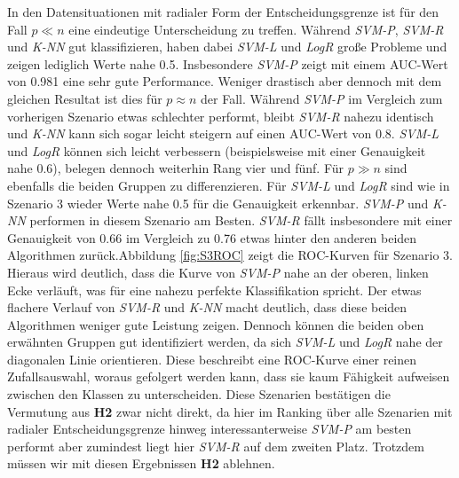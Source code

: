 \documentclass[
]{article}
\begin{document}
In den Datensituationen mit radialer Form der Entscheidungsgrenze ist
für den Fall \(p \ll n\) eine eindeutige Unterscheidung zu treffen.
Während \textit{SVM-P}, \textit{SVM-R} und \textit{K-NN} gut
klassifizieren, haben dabei \textit{SVM-L} und \textit{LogR} große
Probleme und zeigen lediglich Werte nahe 0.5. Insbesondere
\textit{SVM-P} zeigt mit einem AUC-Wert von 0.981 eine sehr gute
Performance. Weniger drastisch aber dennoch mit dem gleichen Resultat
ist dies für \(p \approx n\) der Fall. Während \textit{SVM-P} im
Vergleich zum vorherigen Szenario etwas schlechter performt, bleibt
\textit{SVM-R} nahezu identisch und \textit{K-NN} kann sich sogar leicht
steigern auf einen AUC-Wert von 0.8. \textit{SVM-L} und \textit{LogR}
können sich leicht verbessern (beispielsweise mit einer Genauigkeit nahe
0.6), belegen dennoch weiterhin Rang vier und fünf. Für \(p \gg n\) sind
ebenfalls die beiden Gruppen zu differenzieren. Für \textit{SVM-L} und
\textit{LogR} sind wie in Szenario 3 wieder Werte nahe 0.5 für die
Genauigkeit erkennbar. \textit{SVM-P} und \textit{K-NN} performen in
diesem Szenario am Besten. \textit{SVM-R} fällt insbesondere mit einer
Genauigkeit von 0.66 im Vergleich zu 0.76 etwas hinter den anderen
beiden Algorithmen zurück.\newline Abbildung \ref{fig:S3ROC} zeigt die
ROC-Kurven für Szenario 3. Hieraus wird deutlich, dass die Kurve von
\textit{SVM-P} nahe an der oberen, linken Ecke verläuft, was für eine
nahezu perfekte Klassifikation spricht. Der etwas flachere Verlauf von
\textit{SVM-R} und \textit{K-NN} macht deutlich, dass diese beiden
Algorithmen weniger gute Leistung zeigen. Dennoch können die beiden oben
erwähnten Gruppen gut identifiziert werden, da sich \textit{SVM-L} und
\textit{LogR} nahe der diagonalen Linie orientieren. Diese beschreibt
eine ROC-Kurve einer reinen Zufallsauswahl, woraus gefolgert werden
kann, dass sie kaum Fähigkeit aufweisen zwischen den Klassen zu
unterscheiden. Diese Szenarien bestätigen die Vermutung aus \textbf{H2}
zwar nicht direkt, da hier im Ranking über alle Szenarien mit radialer
Entscheidungsgrenze hinweg interessanterweise \textit{SVM-P} am besten
performt aber zumindest liegt hier \textit{SVM-R} auf dem zweiten Platz.
Trotzdem müssen wir mit diesen Ergebnissen \textbf{H2} ablehnen.
\end{document}
